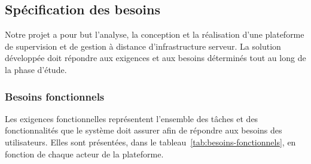 \subsection{Spécification des besoins}
Notre projet a pour but l'analyse, la conception et la réalisation d'une plateforme de
supervision et de gestion à distance d'infrastructure serveur. La solution développée
doit répondre aux exigences et aux besoins déterminés tout au long de la phase d'étude.

\subsubsection*{Besoins fonctionnels}
Les exigences fonctionnelles représentent l'ensemble des tâches et des fonctionnalités
que le système doit assurer afin de répondre aux besoins des utilisateurs. Elles sont
présentées, dans le tableau~\ref{tab:besoins-fonctionnels}, en fonction de chaque acteur
de la plateforme.

